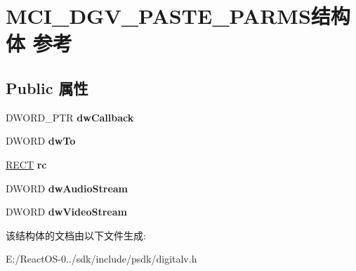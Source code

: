 \hypertarget{struct_m_c_i___d_g_v___p_a_s_t_e___p_a_r_m_s}{}\section{M\+C\+I\+\_\+\+D\+G\+V\+\_\+\+P\+A\+S\+T\+E\+\_\+\+P\+A\+R\+M\+S结构体 参考}
\label{struct_m_c_i___d_g_v___p_a_s_t_e___p_a_r_m_s}
\subsection*{Public 属性}
\begin{DoxyCompactItemize}
\item 
\mbox{\label{struct_m_c_i___d_g_v___p_a_s_t_e___p_a_r_m_s_a553d2fc9f0008065ba98c739e9d65dab}} 
D\+W\+O\+R\+D\+\_\+\+P\+TR {\bfseries dw\+Callback}
\item 
\mbox{\label{struct_m_c_i___d_g_v___p_a_s_t_e___p_a_r_m_s_a1bf35db600f784daa27eb888253db19f}} 
D\+W\+O\+RD {\bfseries dw\+To}
\item 
\mbox{\label{struct_m_c_i___d_g_v___p_a_s_t_e___p_a_r_m_s_ac3bd137cac5c3d872bb1e00a59927f60}} 
\hyperlink{structtag_r_e_c_t}{R\+E\+CT} {\bfseries rc}
\item 
\mbox{\label{struct_m_c_i___d_g_v___p_a_s_t_e___p_a_r_m_s_a03e53dd723181db89c44ed139d5916cb}} 
D\+W\+O\+RD {\bfseries dw\+Audio\+Stream}
\item 
\mbox{\label{struct_m_c_i___d_g_v___p_a_s_t_e___p_a_r_m_s_abc2a74f049a4f1d2db1561256b0ab6b2}} 
D\+W\+O\+RD {\bfseries dw\+Video\+Stream}
\end{DoxyCompactItemize}


该结构体的文档由以下文件生成\+:\begin{DoxyCompactItemize}
\item 
E\+:/\+React\+O\+S-\/0../sdk/include/psdk/digitalv.\+h\end{DoxyCompactItemize}
